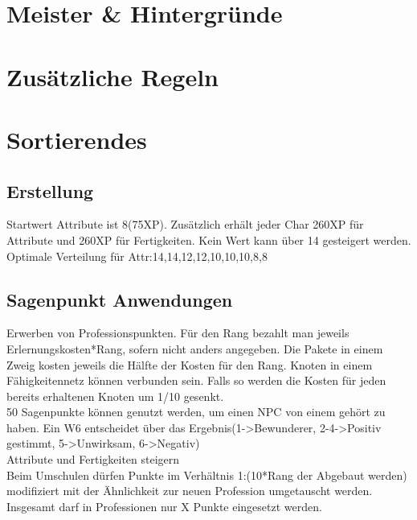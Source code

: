 \documentclass[a4paper,12pt,oneside]{book}
\begin{document}
\part{Meister \& Hintergründe}
\setcounter{chapter}{0}
\part{Zusätzliche Regeln}
\setcounter{chapter}{0}

\part{Sortierendes}

\chapter{Erstellung}
Startwert Attribute ist 8(75XP).
Zusätzlich erhält jeder Char 260XP für Attribute und 260XP für Fertigkeiten. Kein Wert kann über 14 gesteigert werden.
Optimale Verteilung für Attr:14,14,12,12,10,10,10,8,8

\chapter{Sagenpunkt Anwendungen}
Erwerben von Professionspunkten. Für den Rang bezahlt man jeweils Erlernungskosten*Rang, sofern nicht anders angegeben. Die Pakete in einem Zweig kosten jeweils die Hälfte der Kosten für den Rang. Knoten in einem Fähigkeitennetz können verbunden sein. Falls so werden die Kosten für jeden bereits erhaltenen Knoten um 1/10 gesenkt.
\\50 Sagenpunkte können genutzt werden, um einen NPC von einem gehört zu haben. Ein W6 entscheidet über das Ergebnis(1->Bewunderer, 2-4->Positiv gestimmt, 5->Unwirksam, 6->Negativ)
\\Attribute und Fertigkeiten steigern
\\Beim Umschulen dürfen Punkte im Verhältnis 1:(10*Rang der Abgebaut werden) modifiziert mit der Ähnlichkeit zur neuen Profession umgetauscht werden. 
\\Insgesamt darf in Professionen nur X Punkte eingesetzt werden.
\end{document}
